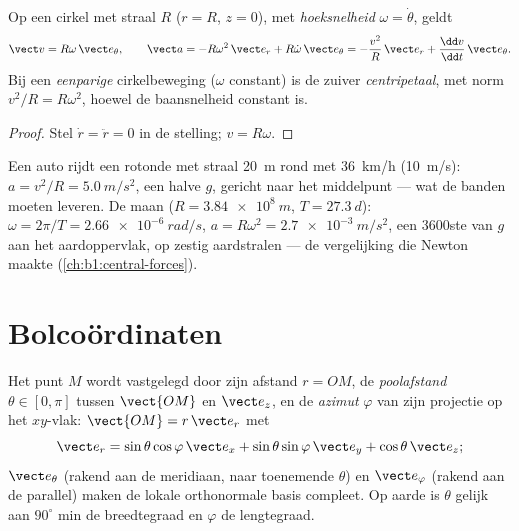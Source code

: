 \begin{corollary}[Cirkelbeweging]\label{cor:b1:point-kinematics:circular}
Op een cirkel met straal $R$ ($r = R$, $z = 0$), met \emph{hoeksnelheid}
$\omega = \dot\theta$, geldt
\[
\vect v = R\omega\,\vect e_\theta, \qquad
\vect a = -R\omega^2\,\vect e_r + R\dot\omega\,\vect e_\theta
= -\frac{v^2}{R}\,\vect e_r + \frac{\dd v}{\dd t}\,\vect e_\theta .
\]
Bij een \emph{eenparige} cirkelbeweging ($\omega$ constant) is de 
zuiver \emph{centripetaal}, met norm $v^2/R = R\omega^2$, hoewel de
baansnelheid constant is.
\end{corollary}

\begin{proof}
Stel $\dot r = \ddot r = 0$ in de stelling; $v = R\omega$.
\end{proof}

\begin{example}\label{ex:b1:point-kinematics:circles}
Een auto rijdt een rotonde met straal \qty{20}{m} rond met \qty{36}{km/h}
(\qty{10}{m/s}): $a = v^2/R = \qty{5.0}{m/s^2}$, een halve $g$, gericht
naar het middelpunt --- wat de banden moeten leveren. De maan
($R = \qty{3.84e8}{m}$, $T = \qty{27.3}{d}$): $\omega = 2\pi/T =
\qty{2.66e-6}{rad/s}$, $a = R\omega^2 = \qty{2.7e-3}{m/s^2}$, een
$3600$ste van $g$ aan het aardoppervlak, op zestig aardstralen --- de
vergelijking die Newton maakte (\cref{ch:b1:central-forces}).
\end{example}

\section{Bolcoördinaten}

\begin{definition}[Bolcoördinaten]\label{def:b1:point-kinematics:spherical}
Het punt $M$ wordt vastgelegd door zijn afstand $r = OM$, de \emph{poolafstand}
$\theta \in [0, \pi]$ tussen $\vect{OM}$ en $\vect e_z$, en de
\emph{azimut} $\varphi$ van zijn projectie op het $xy$-vlak:
$\vect{OM} = r\,\vect e_r$ met
\[
\vect e_r = \sin\theta\cos\varphi\,\vect e_x + \sin\theta\sin\varphi\,\vect e_y + \cos\theta\,\vect e_z ;
\]
$\vect e_\theta$ (rakend aan de meridiaan, naar toenemende $\theta$)
en $\vect e_\varphi$ (rakend aan de parallel) maken de lokale
orthonormale basis compleet. Op aarde is $\theta$ gelijk aan $90^\circ$ min de
breedtegraad en $\varphi$ de lengtegraad.
\end{definition}

